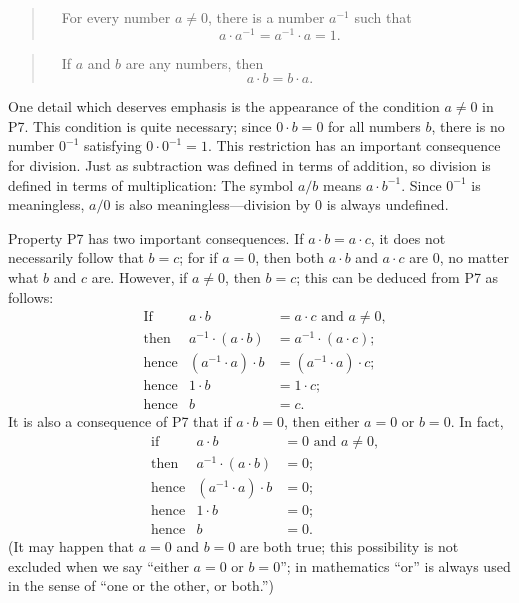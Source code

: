 \begin{quote}
\ \ For every number $a \neq 0$, there is a number $a^{-1}$ such that
\[ a \cdot a^{-1} = a^{-1} \cdot a = 1. \]
\end{quote}

\begin{quote}
\ \ If $a$ and $b$ are any numbers, then
\[ a \cdot b = b \cdot a. \]
\end{quote}

One detail which deserves emphasis is the appearance of the condition
$a \neq 0$ in P7. This condition is quite necessary; since $0 \cdot b = 0$
for all numbers $b$, there is no number $0^{-1}$ satisfying
$0 \cdot 0^{-1} = 1$. This restriction has an important consequence for
division. Just as subtraction was defined in terms of addition, so division
is defined in terms of multiplication: The symbol $a/b$ means $a \cdot b^{-1}$.
Since $0^{-1}$ is meaningless, $a/0$ is also meaningless---division by $0$ is
always undefined.

Property P7 has two important consequences. If $a \cdot b = a \cdot c$, it
does not necessarily follow that $b = c$; for if $a = 0$, then both
$a \cdot b$ and $a \cdot c$ are $0$, no matter what $b$ and $c$ are. However,
if $a \neq 0$, then $b = c$; this can be deduced from P7 as follows:
\begin{align*}
&\text{If} & a \cdot b &= a \cdot c \text{ and } a \neq 0,\\
&\text{then} & a^{-1} \cdot (a \cdot b) &= a^{-1} \cdot (a \cdot c);\\
&\text{hence} & (a^{-1} \cdot a) \cdot b &= (a^{-1} \cdot a) \cdot c;\\
&\text{hence} & 1 \cdot b &= 1 \cdot c;\\
&\text{hence} & b &= c.
\end{align*}
It is also a consequence of P7 that if $a \cdot b = 0$, then either $a = 0$ or
$b = 0$. In fact,
\begin{align*}
&\text{if} & a \cdot b &= 0 \text{ and } a \neq 0,\\
&\text{then} & a^{-1} \cdot (a \cdot b) &= 0;\\
&\text{hence} & (a^{-1} \cdot a) \cdot b &= 0;\\
&\text{hence} & 1 \cdot b &= 0;\\
&\text{hence} & b &= 0.
\end{align*}
(It may happen that $a = 0$ and $b = 0$ are both true; this possibility is
not excluded when we say ``either $a = 0$ or $b = 0$''; in mathematics ``or''
is always used in the sense of ``one or the other, or both.'')


